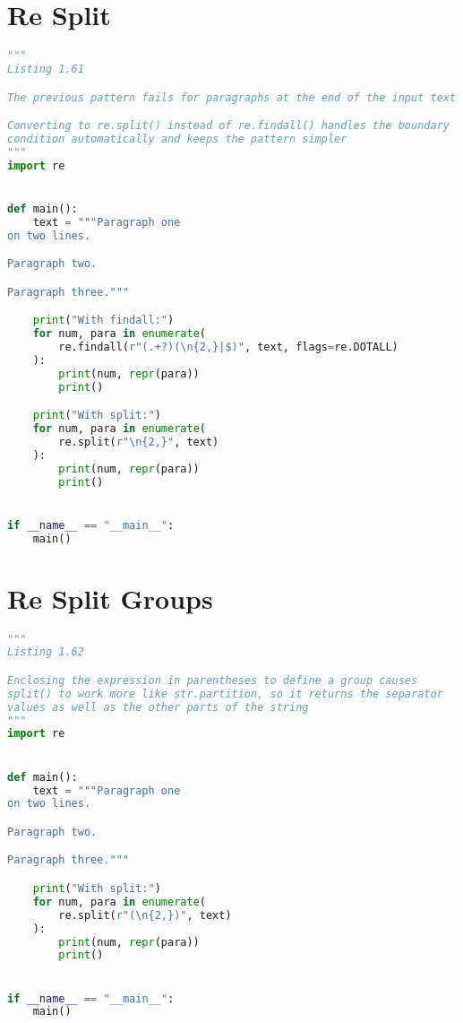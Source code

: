 \documentclass[a4paper,landscape]{report}
\begin{document}
\section{Re Split}
\begin{lstlisting}[language=Python]
"""
Listing 1.61

The previous pattern fails for paragraphs at the end of the input text

Converting to re.split() instead of re.findall() handles the boundary
condition automatically and keeps the pattern simpler
"""
import re


def main():
    text = """Paragraph one
on two lines.

Paragraph two.

Paragraph three."""

    print("With findall:")
    for num, para in enumerate(
        re.findall(r"(.+?)(\n{2,}|$)", text, flags=re.DOTALL)
    ):
        print(num, repr(para))
        print()

    print("With split:")
    for num, para in enumerate(
        re.split(r"\n{2,}", text)
    ):
        print(num, repr(para))
        print()


if __name__ == "__main__":
    main()

\end{lstlisting}
\section{Re Split Groups}
\begin{lstlisting}[language=Python]
"""
Listing 1.62

Enclosing the expression in parentheses to define a group causes
split() to work more like str.partition, so it returns the separator
values as well as the other parts of the string
"""
import re


def main():
    text = """Paragraph one
on two lines.

Paragraph two.

Paragraph three."""

    print("With split:")
    for num, para in enumerate(
        re.split(r"(\n{2,})", text)
    ):
        print(num, repr(para))
        print()


if __name__ == "__main__":
    main()

\end{lstlisting}
\end{document}
